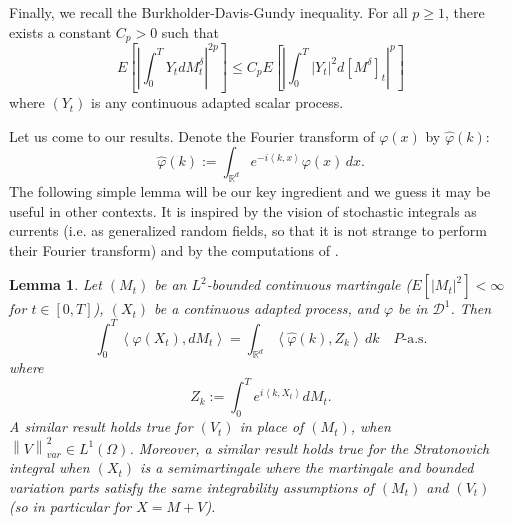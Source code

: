\documentclass{article}
\newtheorem{lemma}[theorem]{Lemma}
\begin{document}
Finally, we recall the Burkholder-Davis-Gundy inequality. For all $p\geq 1$,
there exists a constant $C_{p}>0$ such that 
\begin{equation*}
E\left[ \left| \int_{0}^{T}Y_{t}dM_{t}^{\delta}\right| ^{2p}\right] \leq C_{p}E%
\left[ \left| \int_{0}^{T}\left| Y_{t}\right| ^{2}d\left[ M^{\delta}\right]
_{t}\right| ^{p}\right]
\end{equation*}
where $\left( Y_{t}\right) $ is any continuous adapted scalar process.

Let us come to our results. Denote the Fourier transform of $\varphi \left(
x\right) $ by $\hat{\varphi}\left( k\right) $: 
\begin{equation*}
\hat{\varphi}\left( k\right) :=\int_{\mathbb{R}^{d}}e^{-i\left\langle
k,x\right\rangle }\varphi \left( x\right) \,dx.
\end{equation*}
The following simple lemma will be our key ingredient and we guess it may be
useful in other contexts. It is inspired by the vision of stochastic
integrals as currents (i.e. as generalized random fields, so that it is not
strange to perform their Fourier transform) and by the computations of \cite
{FGub}.
%
\begin{lemma}
Let $\left( M_{t}\right) $ be an $L^{2}$-bounded continuous martingale ($%
E[ | M_{t}| ^{2}]
< \infty$ for $t \in [0,T]$), $(X_{t})$ be a continuous adapted process, and $\varphi $ be in $%
\mathcal{D}^{1}$. Then 
\begin{equation}
\int_{0}^{T}\left\langle \varphi \left( X_{t}\right) ,dM_{t}\right\rangle
=\int_{\mathbb{R}^{d}}\left\langle \hat{\varphi}\left( k\right)
,Z_{k}\right\rangle \,dk\quad P\text{-a.s.}  \label{fouriercharact}
\end{equation}
where 
\begin{equation*}
Z_{k}:=\int_{0}^{T}e^{i\left\langle k,X_{t}\right\rangle }dM_{t}.
\end{equation*}
A similar result holds true for $\left( V_{t}\right) $ in place of $\left(
M_{t}\right) $, when $\left\| V\right\| _{var}^{2}\in L^{1}\left( \Omega
\right) $. Moreover, a similar result holds true for the Stratonovich
integral when $(X_{t})$ is a semimartingale where the martingale and bounded
variation parts satisfy the same integrability assumptions of $\left(
M_{t}\right) $ and $\left( V_{t}\right) $ (so in particular for $X=M+V$).
\end{lemma}
%
\end{document}

